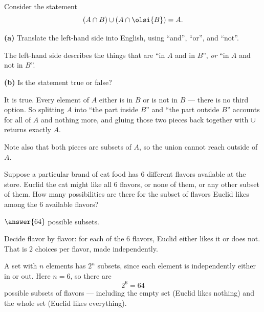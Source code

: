 \documentclass[12pt]{ximera}
\begin{document}
\begin{problem}
Consider the statement
\[ \left(A\cap B\right)\cup\left(A\cap\olsi{B}\right) = A. \]

\begin{prompt}
\textbf{(a)} Translate the left-hand side into English, using ``and'', ``or'', and
``not''.

\begin{freeResponse}
\end{freeResponse}

\begin{solution}
The left-hand side describes the things that are ``in $A$ and in $B$'', \emph{or}
``in $A$ and not in $B$''.
\end{solution}
\end{prompt}

\begin{prompt}
\textbf{(b)} Is the statement true or false?

\begin{multipleChoice}
\end{multipleChoice}

\begin{solution}
It is true. Every element of $A$ either is in $B$ or is not in $B$ --- there is no
third option. So splitting $A$ into ``the part inside $B$'' and ``the part outside
$B$'' accounts for all of $A$ and nothing more, and gluing those two pieces back
together with $\cup$ returns exactly $A$.

Note also that both pieces are subsets of $A$, so the union cannot reach outside of
$A$.
\end{solution}
\end{prompt}
\end{problem}

\begin{problem}
Suppose a particular brand of cat food has $6$ different flavors available at the
store. Euclid the cat might like all $6$ flavors, or none of them, or any other
subset of them. How many possibilities are there for the subset of flavors Euclid
likes among the $6$ available flavors?

$\answer{64}$ possible subsets.

\begin{hint}
Decide flavor by flavor: for each of the $6$ flavors, Euclid either likes it or does
not. That is $2$ choices per flavor, made independently.
\end{hint}

\begin{solution}
A set with $n$ elements has $2^n$ subsets, since each element is independently either
in or out. Here $n=6$, so there are
\[ 2^6 = 64 \]
possible subsets of flavors --- including the empty set (Euclid likes nothing) and
the whole set (Euclid likes everything).
\end{solution}
\end{problem}
\end{document}
